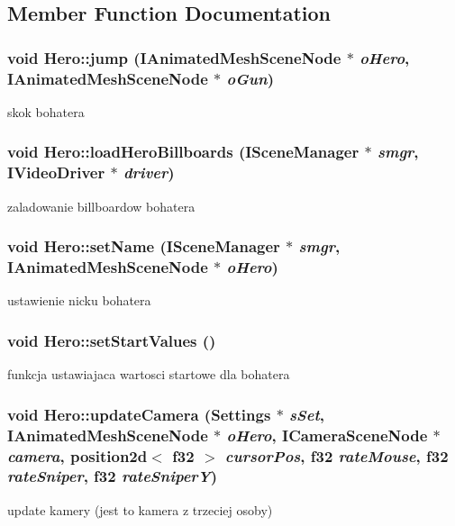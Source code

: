 \subsection{Member Function Documentation}
\hypertarget{class_hero_a46f8101e8f28057d8cc048cf9496db35}{
\subsubsection[{jump}]{\setlength{\rightskip}{0pt plus 5cm}void Hero::jump (IAnimatedMeshSceneNode $\ast$ {\em oHero}, \/  IAnimatedMeshSceneNode $\ast$ {\em oGun})}}
\label{class_hero_a46f8101e8f28057d8cc048cf9496db35}
skok bohatera \hypertarget{class_hero_a7682852f066beb607b1cf96894c40201}{
\subsubsection[{loadHeroBillboards}]{\setlength{\rightskip}{0pt plus 5cm}void Hero::loadHeroBillboards (ISceneManager $\ast$ {\em smgr}, \/  IVideoDriver $\ast$ {\em driver})}}
\label{class_hero_a7682852f066beb607b1cf96894c40201}
zaladowanie billboardow bohatera \hypertarget{class_hero_a27173f26480105b6acbf3ab740c9b82b}{
\subsubsection[{setName}]{\setlength{\rightskip}{0pt plus 5cm}void Hero::setName (ISceneManager $\ast$ {\em smgr}, \/  IAnimatedMeshSceneNode $\ast$ {\em oHero})}}
\label{class_hero_a27173f26480105b6acbf3ab740c9b82b}
ustawienie nicku bohatera \hypertarget{class_hero_ab87e6847fb025a4be4b6d33ed429f7d0}{
\subsubsection[{setStartValues}]{\setlength{\rightskip}{0pt plus 5cm}void Hero::setStartValues ()}}
\label{class_hero_ab87e6847fb025a4be4b6d33ed429f7d0}
funkcja ustawiajaca wartosci startowe dla bohatera \hypertarget{class_hero_abbbe33967d88b417ea31f86ab68d9499}{
\subsubsection[{updateCamera}]{\setlength{\rightskip}{0pt plus 5cm}void Hero::updateCamera ({\bf Settings} $\ast$ {\em sSet}, \/  IAnimatedMeshSceneNode $\ast$ {\em oHero}, \/  ICameraSceneNode $\ast$ {\em camera}, \/  position2d$<$ f32 $>$ {\em cursorPos}, \/  f32 {\em rateMouse}, \/  f32 {\em rateSniper}, \/  f32 {\em rateSniperY})}}
\label{class_hero_abbbe33967d88b417ea31f86ab68d9499}
update kamery (jest to kamera z trzeciej osoby) 

